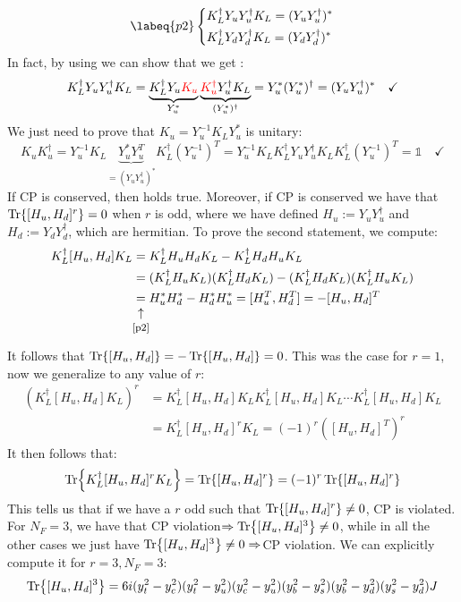 \documentclass[../main.tex]{subfiles}
\begin{document}
\begin{equation}
\labeq{p2}
\left\{
\begin{aligned}
&K_L^\dagger Y_uY_u^\dagger K_L=(Y_uY_u^\dagger)^*\\
&K_L^\dagger Y_dY_d^\dagger K_L=(Y_dY_d^\dagger)^*
\end{aligned}
\right.
\end{equation}
In fact, by using  we can show that we get :
\[
K_L^\dagger Y_uY_u^\dagger K_L=\underbrace{K_L^\dagger Y_u{\color{red}K_u}}_{Y_u^*}\underbrace{{\color{red}K_u^\dagger}Y_u^\dagger K_L}_{(Y_u^*)^\dagger}=Y_u^*(Y_u^*)^\dagger=(Y_uY_u^\dagger)^* \quad \checkmark
\]
We just need to prove that $K_u=Y_u^{-1}K_LY_u^*$ is unitary:
\[
K_uK_u^\dagger=Y_u^{-1}K_L\underbrace{Y_u^*Y_u^T}_{=(Y_uY_u^\dagger)^*}K_L^\dagger(Y_u^{-1})^T=Y_u^{-1}K_LK_L^\dagger Y_uY_u^\dagger K_LK_L^\dagger(Y_u^{-1})^T=\mathbb{1} \quad \checkmark
\]
If CP is conserved, then  holds true. Moreover, if CP is conserved we have that $\Tr{[H_u,H_d]^r}=0$ when $r$ is odd, where we have defined $H_u:=Y_uY_u^\dagger$ and $H_d:=Y_dY_d^\dagger$, which are hermitian. To prove the second statement, we compute:
\begin{align*}
K_L^\dagger[H_u,H_d]K_L&=K_L^\dagger H_uH_dK_L-K_L^\dagger H_dH_uK_L\\
&=(K_L^\dagger H_uK_L)(K_L^\dagger H_dK_L)-(K_L^\dagger H_dK_L)(K_L^\dagger H_uK_L)\\
&\underset{\mathclap{\tikz \node {$\uparrow$} node [below=1ex] {\footnotesize \refeq{p2} };}}{=}H_u^*H_d^*-H_d^*H_u^*=[H_u^T,H_d^T]=-[H_u,H_d]^T
\end{align*}
It follows that $\Tr{[H_u,H_d]}=-\Tr{[H_u,H_d]}=0$. This was the case for $r=1$, now we generalize to any value of $r$:
\begin{align*}
\left(K_L^\dagger[H_u,H_d]K_L\right)^r&=K_L^\dagger[H_u,H_d]K_LK_L^\dagger[H_u,H_d]K_L\cdots K_L^\dagger[H_u,H_d]K_L\\
&=K_L^\dagger[H_u,H_d]^rK_L=(-1)^r\left([H_u,H_d]^T\right)^r
\end{align*}
It then follows that: 
\[
\Tr{K_L^\dagger[H_u,H_d]^rK_L}=\Tr{[H_u,H_d]^r}=(-1)^r\Tr{[H_u,H_d]^r}
\]
This tells us that if we have a $r$ odd such that $\Tr{[H_u,H_d]^r}\neq0$, CP is violated. For $N_F=3$, we have that CP violation$\Rightarrow\Tr{[H_u,H_d]^3}\neq0$, while in all the other cases we just have $\Tr{[H_u,H_d]^3}\neq0\Rightarrow$CP violation. We can explicitly compute it for $r=3, N_F=3$:
\[
\Tr{[H_u,H_d]^3}=6i(y_t^2-y_c^2)(y_t^2-y_u^2)(y_c^2-y_u^2)(y_b^2-y_s^2)(y_b^2-y_d^2)(y_s^2-y_d^2)J
\]
\end{document}

